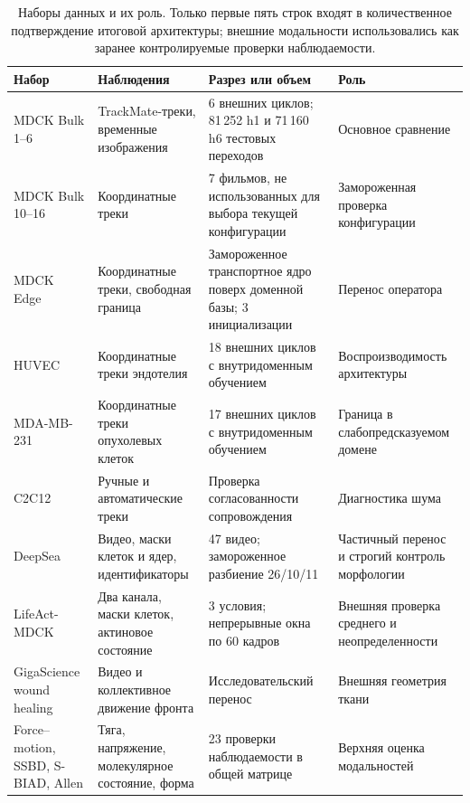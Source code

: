 \documentclass[11pt,a4paper]{article}
\begin{document}
\begin{table}[tb]
\centering
\caption{Наборы данных и их роль. Только первые пять строк входят в количественное подтверждение итоговой архитектуры; внешние модальности использовались как заранее контролируемые проверки наблюдаемости.}
\label{tab:data}
\small
\begin{tabularx}{\textwidth}{@{}L{0.20\textwidth} L{0.25\textwidth} Y L{0.21\textwidth}@{}}
\toprule
Набор & Наблюдения & Разрез или объем & Роль \\
\midrule
MDCK Bulk 1--6 & TrackMate-треки, временные изображения & 6 внешних циклов; 81\,252 h1 и 71\,160 h6 тестовых переходов & Основное сравнение \\
MDCK Bulk 10--16 & Координатные треки & 7 фильмов, не использованных для выбора текущей конфигурации & Замороженная проверка конфигурации \\
MDCK Edge & Координатные треки, свободная граница & Замороженное транспортное ядро поверх доменной базы; 3 инициализации & Перенос оператора \\
HUVEC & Координатные треки эндотелия & 18 внешних циклов с внутридоменным обучением & Воспроизводимость архитектуры \\
MDA-MB-231 & Координатные треки опухолевых клеток & 17 внешних циклов с внутридоменным обучением & Граница в слабопредсказуемом домене \\
\midrule
C2C12 & Ручные и автоматические треки & Проверка согласованности сопровождения & Диагностика шума \\
DeepSea & Видео, маски клеток и ядер, идентификаторы & 47 видео; замороженное разбиение 26/10/11 & Частичный перенос и строгий контроль морфологии \\
LifeAct-MDCK & Два канала, маски клеток, актиновое состояние & 3 условия; непрерывные окна по 60 кадров & Внешняя проверка среднего и неопределенности \\
GigaScience wound healing & Видео и коллективное движение фронта & Исследовательский перенос & Внешняя геометрия ткани \\
Force--motion, SSBD, S-BIAD, Allen & Тяга, напряжение, молекулярное состояние, форма & 23 проверки наблюдаемости в общей матрице & Верхняя оценка модальностей \\
\bottomrule
\end{tabularx}
\end{table}
\end{document}
